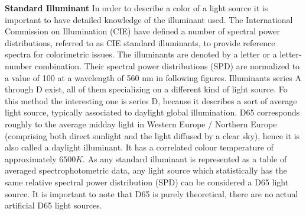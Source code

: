 \textbf{Standard Illuminant}\newline
In order to describe a color of a light source it is important to have detailed knowledge of the illuminant used. The International Commission on Illumination (CIE)  have defined a number of spectral power distributions, referred to as CIE standard illuminants, to provide reference spectra for colorimetric issues. The illuminants are denoted by a letter or a letter-number combination. Their spectral power distributions (SPD) are normalized to a value of 100 at a wavelength of 560 nm in following figures. Illuminants series A through D exist, all of them specializing on a different kind of light source. Fo this method the interesting one is series D, because it describes a sort of average light source, typically associated to daylight global illumination.\newline
D65 corresponds roughly to the average midday light in Western Europe / Northern Europe (comprising both direct sunlight and the light diffused by a clear sky), hence it is also called a daylight illuminant. It has a correlated colour temperature of approximately $6500 K$. As any standard illuminant is represented as a table of averaged spectrophotometric data, any light source which statistically has the same relative spectral power distribution (SPD) can be considered a D65 light source. It is important to note that D65 is purely theoretical, there are no actual artificial D65 light sources.\cite{DeeSixFive}